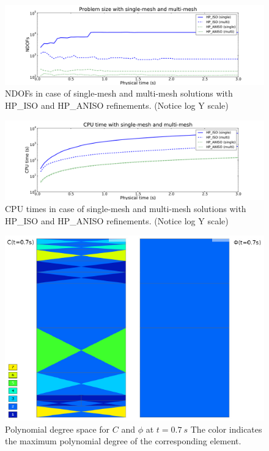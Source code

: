 \begin{figure}[!ht]
  \begin{centering}
  \includegraphics[width=\columnwidth]{singlemulti_dof}
  \caption{\label{fig:singlemultidof} NDOFs in case 
  of single-mesh and multi-mesh solutions with HP\_ISO
  and HP\_ANISO refinements. (Notice log Y scale)}
  \end{centering}
\end{figure}

\begin{figure}[!ht]
  \begin{centering}
  \includegraphics[width=\columnwidth]{singlemulti_cpu}
  \caption{\label{fig:singlemulticpu} CPU times in case
  of single-mesh and multi-mesh solutions with HP\_ISO
  and HP\_ANISO refinements. (Notice log Y scale)}
  \end{centering}
\end{figure}

\begin{figure}[!ht]
  \begin{centering}
  \includegraphics[width=.75\columnwidth]{poly}
  \caption{\label{fig:poly} Polynomial degree space
  for $C$ and $\phi$ at $t=0.7\ s$ The color indicates
  the maximum polynomial degree of the corresponding element.}
  \end{centering}
\end{figure}


